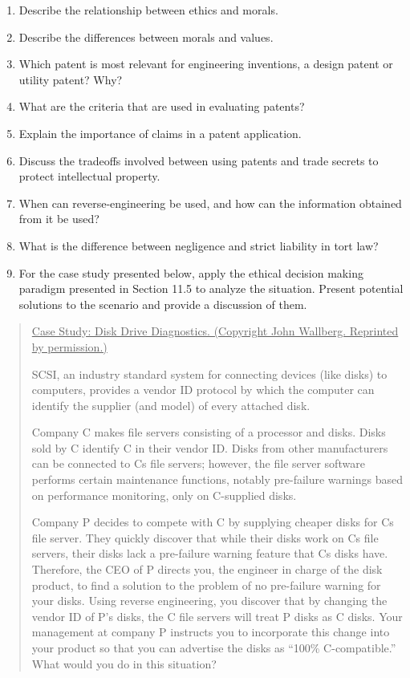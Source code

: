 \begin{enumerate}
\def\labelenumi{\arabic{enumi}.}
\item
  Describe the relationship between ethics and morals.
\item
  Describe the differences between morals and values.
\item
  Which patent is most relevant for engineering inventions, a design
  patent or utility patent? Why?
\item
  What are the criteria that are used in evaluating patents?
\item
  Explain the importance of claims in a patent application.
\item
  Discuss the tradeoffs involved between using patents and trade secrets
  to protect intellectual property.
\item
  When can reverse-engineering be used, and how can the information
  obtained from it be used?
\item
  What is the difference between negligence and strict liability in tort
  law?
\item
  For the case study presented below, apply the ethical decision making
  paradigm presented in Section 11.5 to analyze the situation. Present
  potential solutions to the scenario and provide a discussion of them.
\end{enumerate}

\begin{quote}
\ul{\hfill\break
Case Study: Disk Drive Diagnostics. (Copyright John Wallberg. Reprinted
by permission.)}

SCSI, an industry standard system for connecting devices (like disks) to
computers, provides a vendor ID protocol by which the computer can
identify the supplier (and model) of every attached disk.

Company C makes file servers consisting of a processor and disks. Disks
sold by C identify C in their vendor ID. Disks from other manufacturers
can be connected to C\textquotesingle s file servers; however, the file
server software performs certain maintenance functions, notably
pre-failure warnings based on performance monitoring, only on C-supplied
disks.

Company P decides to compete with C by supplying cheaper disks for
C\textquotesingle s file server. They quickly discover that while their
disks work on C\textquotesingle s file servers, their disks lack a
pre-failure warning feature that C\textquotesingle s disks have.
Therefore, the CEO of P directs you, the engineer in charge of the disk
product, to find a solution to the problem of no pre-failure warning for
your disks. Using reverse engineering, you discover that by changing the
vendor ID of P's disks, the C file servers will treat P disks as C
disks. Your management at company P instructs you to incorporate this
change into your product so that you can advertise the disks as ``100\%
C-compatible.'' What would you do in this situation?
\end{quote}


